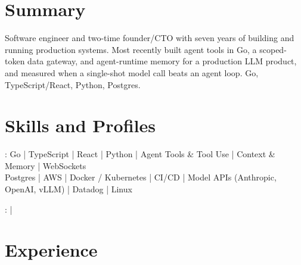 \documentclass[print]{jack-resume}
\begin{document}
\pagecolor{darkmodeBackground}


\begin{minipage}[t][1cm][t]{.03\textwidth}
    \hfill
\end{minipage}

\section{Summary}
Software engineer and two-time founder/CTO with seven years of building and running production systems. Most recently built agent tools in Go, a scoped-token data gateway, and agent-runtime memory for a production LLM product, and measured when a single-shot model call beats an agent loop. Go, TypeScript/React, Python, Postgres.
\sectionsep

\section{Skills and Profiles}
:
Go \hfill | \hfill
TypeScript \hfill | \hfill
React \hfill | \hfill
Python \hfill | \hfill
Agent Tools \& Tool Use \hfill | \hfill
Context \& Memory \hfill | \hfill
WebSockets \\
\hspace{1.0cm} Postgres \hfill | \hfill
AWS \hfill | \hfill
Docker / Kubernetes \hfill | \hfill
CI/CD \hfill | \hfill
Model APIs (Anthropic, OpenAI, vLLM) \hfill | \hfill
Datadog \hfill | \hfill
Linux \\

\raggedright{
    :
      \href{https://www.linkedin.com/in/jack-sturtevant/}{ \ExternalLink} |
     \href{https://github.com/jacksturt}{ \ExternalLink}}

\section{Experience}
\end{document}
